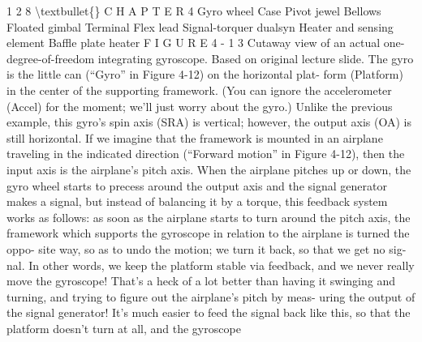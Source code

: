 \documentclass[10pt,oneside]{article}
\begin{document}
1 2 8 \textbackslash{}textbullet\{\} C H A P T E R  4 Gyro wheel Case Pivot jewel Bellows Floated gimbal Terminal Flex lead Signal-torquer dualsyn Heater and sensing element Baffle plate heater F I G U R E  4 - 1 3 Cutaway view of an actual one-degree-of-freedom integrating gyroscope. Based on original lecture slide. The gyro is the little can (“Gyro” in Figure 4-12) on the horizontal plat- form (Platform) in the center of the supporting framework. (You can ignore the accelerometer (Accel) for the moment; we’ll just worry about the gyro.) Unlike the previous example, this gyro’s spin axis (SRA) is vertical; however, the output axis (OA) is still horizontal. If we imagine that the framework is mounted in an airplane traveling in the indicated direction (“Forward motion” in Figure 4-12), then the input axis is the airplane’s pitch axis. When the airplane pitches up or down, the gyro wheel starts to precess around the output axis and the signal generator makes a signal, but instead of balancing it by a torque, this feedback system works as follows: as soon as the airplane starts to turn around the pitch axis, the framework which supports the gyroscope in relation to the airplane is turned the oppo- site way, so as to undo the motion; we turn it back, so that we get no sig- nal. In other words, we keep the platform stable via feedback, and we never really move the gyroscope! That’s a heck of a lot better than having it swinging and turning, and trying to figure out the airplane’s pitch by meas- uring the output of the signal generator! It’s much easier to feed the signal back like this, so that the platform doesn’t turn at all, and the gyroscope\par
\end{document}
